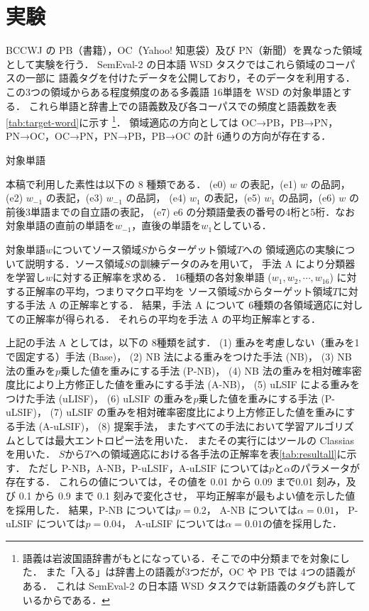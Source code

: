 \documentclass[japanese]{jnlp_1.4}
\begin{document}
\section{実験}

BCCWJ の PB（書籍），OC（Yahoo! 知恵袋）及び PN（新聞）を異なった領域として実験を行う．
SemEval-2 の日本語 WSD タスク\cite{semeval-2010}ではこれら領域のコーパスの一部に
語義タグを付けたデータを公開しており，そのデータを利用する．
この3つの領域からある程度頻度のある多義語 16単語を WSD の対象単語とする．
これら単語と辞書上での語義数及び各コーパスでの頻度と語義数を\mbox{表\ref{tab:target-word}}に示す
\footnote{語義は岩波国語辞書がもとになっている．そこでの中分類までを対象にした．
また「入る」は辞書上の語義が3つだが，OC や PB では 4つの語義がある．
これは SemEval-2 の日本語 WSD タスクでは新語義のタグも許しているからである．}．
領域適応の方向としては OC→PB，PB→PN，PN→OC，OC→PN，PN→PB，PB→OC
の計 6通りの方向が存在する．

\begin{table}[t]
\caption{対象単語}
\label{tab:target-word}

\end{table}

本稿で利用した素性は以下の 8 種類である．
(e0) $w$ の表記，(e1) $w$ の品詞，(e2) $w_{-1}$ の表記，(e3) $w_{-1}$ の品詞，
(e4) $w_1$ の表記，(e5) $w_1$ の品詞，(e6) $w$ の前後3単語までの自立語の表記，
(e7) e6 の分類語彙表の番号の4桁と5桁．なお対象単語の直前の単語を$w_{-1}$，直後の単語を$w_1$としている．

対象単語$w$についてソース領域$S$からターゲット領域$T$への
領域適応の実験について説明する．ソース領域$S$の訓練データのみを用いて，
手法 A により分類器を学習し$w$に対する正解率を求める．
16種類の各対象単語 ($w_1,w_2, \cdots, w_{16}$) に対する正解率の平均，つまりマクロ平均を
ソース領域$S$からターゲット領域$T$に対する手法 A の正解率とする．
結果，手法 A について 6種類の各領域適応に対しての正解率が得られる．
それらの平均を手法 A の平均正解率とする．

上記の手法 A としては，以下の 8種類を試す．
(1) 重みを考慮しない（重みを1で固定する）手法 (Base)，
(2) NB 法による重みをつけた手法 (NB)，
(3) NB 法の重みを$p$乗した値を重みにする手法 (P-NB)，
(4) NB 法の重みを相対確率密度比により上方修正した値を重みにする手法 (A-NB)，
(5) uLSIF による重みをつけた手法 (uLISF)，
(6) uLSIF の重みを$p$乗した値を重みにする手法 (P-uLSIF)，
(7) uLSIF の重みを相対確率密度比により上方修正した値を重みにする手法 (A-uLSIF)，
(8) 提案手法，
またすべての手法において学習アルゴリズムとしては最大エントロピー法を用いた．
またその実行にはツールの Classias を用いた\cite{Classias}．
$S$から$T$への領域適応における各手法の正解率を\mbox{表\ref{tab:resultall}}に示す．
ただし P-NB，A-NB，P-uLSIF，A-uLSIF については$p$と$\alpha$のパラメータが存在する．
これらの値については，その値を 0.01 から 0.09 まで0.01 刻み，及び 0.1 から 0.9 まで 0.1 刻みで変化させ，
平均正解率が最もよい値を示した値を採用した．
結果，P-NB については$p = 0.2$，
A-NB については$\alpha = 0.01$，
P-uLSIF については$p = 0.04$，
A-uLSIF については$\alpha = 0.01$の値を採用した．
\end{document}
